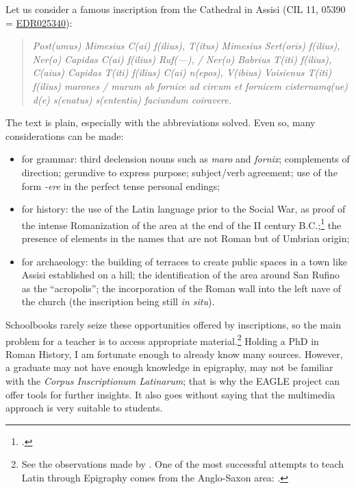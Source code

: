 \documentclass[amsthm,ebook]{saparticle}
\begin{document}
Let us consider a famous inscription from the Cathedral in Assisi (CIL 11, 05390 = \href{http://www.edr-edr.it/edr\_programmi/res\_complex\_comune.php?do=book\&id\_nr=EDR025340}{EDR025340}):

\begin{quotation}
\emph{Post(umus) Mimesius C(ai) f(ilius), T(itus) Mimesius Sert(oris) f(ilius), Ner(o) Capidas C(ai) f(ilius) Ruf(---), /
Ner(o) Babrius T(iti) f(ilius), C(aius) Capidas T(iti) f(ilius) C(ai) n(epos), V(ibius) Voisienus T(iti) f(ilius)
marones / murum ab fornice ad circum et fornicem cisternamq(ue) d(e) s(enatus) s(ententia) faciundum coiravere.}

\end{quotation}
The text is plain, especially with the abbreviations solved. Even so, many considerations can be
made:

\begin{itemize}
\item for grammar: third declension nouns such as \emph{maro} and \emph{fornix}; complements of direction; gerundive to express
purpose; subject/verb agreement; use of the form {}\emph{-ere} in the perfect tense personal endings;
\item for history: the use of the Latin language prior to the Social War, as proof of the intense Romanization of the
area at the end of the II century B.C.;\footnote{\citet{Coarelli1991}.} the presence of elements in the names that are not
Roman but of Umbrian origin;
\item for archaeology: the building of terraces to create public spaces in a town like Assisi established on a hill; the
identification of the area around San Rufino as the ``acropolis''; the incorporation of the Roman wall into the left nave
of the church (the inscription being still \emph{in situ}).
\end{itemize}



Schoolbooks rarely seize these opportunities offered by inscriptions, so the main problem for a teacher is to access
appropriate material.\footnote{ See the observations made by \citet{Carpenter2006}. One of the most successful attempts to teach Latin through Epigraphy comes from the Anglo-Saxon area: \citet{LaFleur2010}.} Holding a PhD in Roman History, I am fortunate enough to already know many sources. However, a graduate may not have enough
knowledge in epigraphy, may not be familiar with the \emph{Corpus Inscriptionum Latinarum}; that is why the EAGLE project can offer tools for further insights. It also goes without saying that the multimedia approach is very suitable to students.
\end{document}
